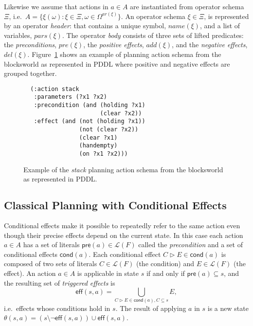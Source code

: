 \documentclass[letterpaper]{article} %
\newcommand{\pre}{\mathsf{pre}}     %
\newcommand{\eff}{\mathsf{eff}}     %
\newcommand{\cond}{\mathsf{cond}}   %
\begin{document}
Likewise we assume that actions in $a\in A$ are instantiated from operator schema $\Xi$, i.e.~$A=\{\xi(\omega):\xi\in\Xi,\omega\in\Omega^{ar(\xi)}\}$. An operator schema $\xi\in \Xi$, is represented by an operator {\em header}: that contains a unique symbol, $name(\xi)$, and a list of variables, $pars(\xi)$. The operator {\em body} consists of three sets of lifted predicates: the {\em preconditions}, $pre(\xi)$, the {\em positive effects}, $add(\xi)$, and the {\em negative effects}, $del(\xi)$. Figure~\ref{fig:stack} shows an example of planning action schema from the blocksworld as represented in PDDL where positive and negative effects are grouped together.

\begin{figure}[hbt]
\begin{footnotesize}
\begin{verbatim}
  (:action stack
   :parameters (?x1 ?x2)
   :precondition (and (holding ?x1) 
                      (clear ?x2))
   :effect (and (not (holding ?x1))
                (not (clear ?x2))
                (clear ?x1)
                (handempty)
                (on ?x1 ?x2)))
\end{verbatim}
\end{footnotesize}
 \caption{\small Example of the {\em stack} planning action schema from the blocksworld as represented in PDDL.}
\label{fig:stack}
\end{figure}


\subsection{Classical Planning with Conditional Effects}
Conditional effects make it possible to repeatedly refer to the same action even though their precise effects depend on the current state. In this case each action $a\in A$ has a set of literals $\pre(a)\in\mathcal{L}(F)$ called the {\em precondition} and a set of conditional effects $\cond(a)$. Each conditional effect $C\rhd E\in\cond(a)$ is composed of two sets of literals $C\in\mathcal{L}(F)$ (the condition) and $E\in\mathcal{L}(F)$ (the effect). An action $a\in A$ is applicable in state $s$ if and only if $\pre(a)\subseteq s$, and the resulting set of {\em triggered effects} is
\[
\eff(s,a)=\bigcup_{C\rhd E\in\cond(a),C\subseteq s} E,
\]
i.e.~effects whose conditions hold in $s$. The result of applying $a$ in $s$ is a new state $\theta(s,a)=(s\setminus \neg\eff(s,a))\cup\eff(s,a)$.
\end{document}
